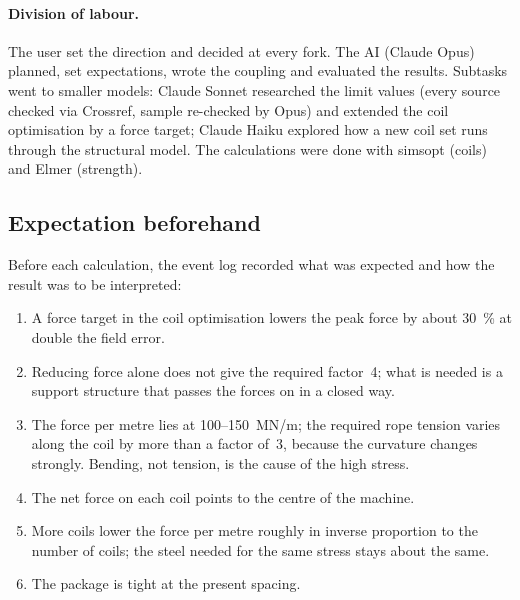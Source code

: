 \paragraph{Division of labour.} The user set the direction and decided at every fork. The AI (Claude Opus) planned,
set expectations, wrote the coupling and evaluated the results. Subtasks went to smaller models: Claude Sonnet
researched the limit values (every source checked via Crossref, sample re-checked by Opus) and extended the coil
optimisation by a force target; Claude Haiku explored how a new coil set runs through the structural model. The
calculations were done with simsopt \cite{simsopt} (coils) and Elmer \cite{elmer} (strength).

\subsection*{Expectation beforehand}
Before each calculation, the event log recorded what was expected and how the result was to be interpreted:
\begin{enumerate}\itemsep1pt
\item A force target in the coil optimisation lowers the peak force by about 30~\% at double the field error.
\item Reducing force alone does not give the required factor~4; what is needed is a support structure that passes the
  forces on in a closed way.
\item The force per metre lies at 100--150~MN/m; the required rope tension varies along the coil by more than a factor
  of~3, because the curvature changes strongly. Bending, not tension, is the cause of the high stress.
\item The net force on each coil points to the centre of the machine.
\item More coils lower the force per metre roughly in inverse proportion to the number of coils; the steel needed for
  the same stress stays about the same.
\item The package is tight at the present spacing.
\end{enumerate}

